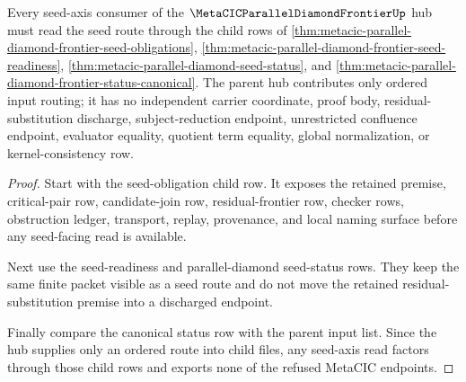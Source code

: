 \begin{theorem}
\label{thm:metacic-parallel-diamond-frontier-seed-axis-summary}
Every seed-axis consumer of the $\MetaCICParallelDiamondFrontierUp$ hub must read the seed route through the child rows of \autoref{thm:metacic-parallel-diamond-frontier-seed-obligations}, \autoref{thm:metacic-parallel-diamond-frontier-seed-readiness}, \autoref{thm:metacic-parallel-diamond-seed-status}, and \autoref{thm:metacic-parallel-diamond-frontier-status-canonical}. The parent hub contributes only ordered input routing; it has no independent carrier coordinate, proof body, residual-substitution discharge, subject-reduction endpoint, unrestricted confluence endpoint, evaluator equality, quotient term equality, global normalization, or kernel-consistency row.
\end{theorem}
\begin{proof}
Start with the seed-obligation child row. It exposes the retained premise, critical-pair row, candidate-join row, residual-frontier row, checker rows, obstruction ledger, transport, replay, provenance, and local naming surface before any seed-facing read is available.

Next use the seed-readiness and parallel-diamond seed-status rows. They keep the same finite packet visible as a seed route and do not move the retained residual-substitution premise into a discharged endpoint.

Finally compare the canonical status row with the parent input list. Since the hub supplies only an ordered route into child files, any seed-axis read factors through those child rows and exports none of the refused MetaCIC endpoints.
\end{proof}
